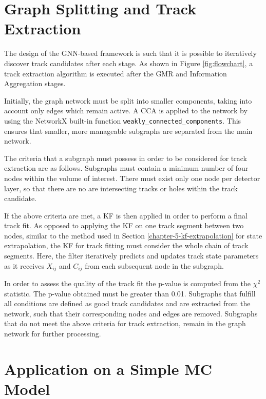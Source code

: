 \section{Graph Splitting and Track Extraction}
\label{gnn-track-extration}

The design of the GNN-based framework is such that it is possible to iteratively discover track candidates after each stage. As shown in Figure \ref{fig:flowchart}, a track extraction algorithm is executed after the GMR and Information Aggregation stages.

Initially, the graph network must be split into smaller components, taking into account only edges which remain active. A CCA is applied to the network by using the NetworkX built-in function \texttt{weakly\_connected\_components}. This ensures that smaller, more manageable subgraphs are separated from the main network.

The criteria that a subgraph must possess in order to be considered for track extraction are as follows. Subgraphs must contain a minimum number of four nodes within the volume of interest. There must exist only one node per detector layer, so that there are no are intersecting tracks or holes within the track candidate. 

If the above criteria are met, a KF is then applied in order to perform a final track fit. As opposed to applying the KF on one track segment between two nodes, similar to the method used in Section \ref{chapter-5-kf-extrapolation} for state extrapolation, the KF for track fitting must consider the whole chain of track segments. Here, the filter iteratively predicts and updates track state parameters as it receives $X_{ij}$ and $C_{ij}$ from each subsequent node in the subgraph.

In order to assess the quality of the track fit the p-value is computed from the $\chi^2$ statistic. The p-value obtained must be greater than 0.01. Subgraphs that fulfill all conditions are defined as good track candidates and are extracted from the network, such that their corresponding nodes and edges are removed. Subgraphs that do not meet the above criteria for track extraction, remain in the graph network for further processing.





\section{Application on a Simple MC Model}
\label{gnn-application-toy-model}


